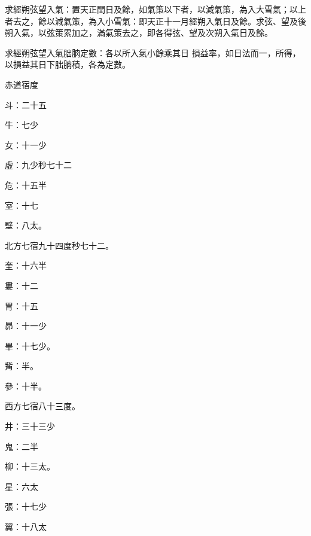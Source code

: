 \begin{pinyinscope}
 求經朔弦望入氣：置天正閏日及餘，如氣策以下者，以減氣策，為入大雪氣；以上者去之，餘以減氣策，為入小雪氣：即天正十一月經朔入氣日及餘。求弦、望及後朔入氣，以弦策累加之，滿氣策去之，即各得弦、望及次朔入氣日及餘。



 求經朔弦望入氣朏朒定數：各以所入氣小餘乘其日
 損益率，如日法而一，所得，以損益其日下朏朒積，各為定數。



 赤道宿度



 斗：二十五



 牛：七少



 女：十一少



 虛：九少秒七十二



 危：十五半



 室：十七



 壁：八太。



 北方七宿九十四度秒七十二。



 奎：十六半



 婁：十二



 胃：十五



 昴：十一少



 畢：十七少。



 觜：半。



 參：十半。



 西方七宿八十三度。



 井：三十三少



 鬼：二半



 柳：十三太。



 星：六太



 張：十七少



 翼：十八太




\end{pinyinscope}
